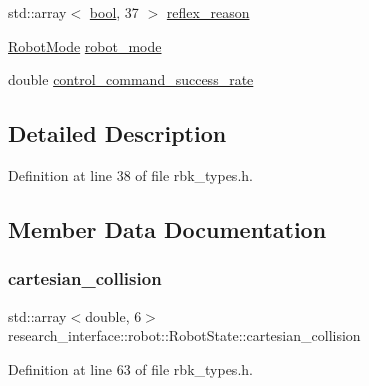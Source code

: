 \begin{DoxyCompactItemize}
\item 
std\+::array$<$ \hyperlink{classbool}{bool}, 37 $>$ \hyperlink{structresearch__interface_1_1robot_1_1RobotState_a173478c94fcf79e6aa2477742eaf1201}{reflex\+\_\+reason}
\item 
\hyperlink{namespaceresearch__interface_1_1robot_a9d089d8f41640bff616c6d4c69ae5c37}{Robot\+Mode} \hyperlink{structresearch__interface_1_1robot_1_1RobotState_a39452d1cd54a0a8b70d5eb6389bbeee7}{robot\+\_\+mode}
\item 
double \hyperlink{structresearch__interface_1_1robot_1_1RobotState_acfa9abdc95abc44b60eb3cd2cc82d37e}{control\+\_\+command\+\_\+success\+\_\+rate}
\end{DoxyCompactItemize}


\subsection{Detailed Description}


Definition at line 38 of file rbk\+\_\+types.\+h.



\subsection{Member Data Documentation}
\mbox{\label{structresearch__interface_1_1robot_1_1RobotState_a26957c17524dd6dbe3b8327db571403a}} 
\subsubsection{\texorpdfstring{cartesian\+\_\+collision}{cartesian\_collision}}
{\footnotesize\ttfamily std\+::array$<$double, 6$>$ research\+\_\+interface\+::robot\+::\+Robot\+State\+::cartesian\+\_\+collision}



Definition at line 63 of file rbk\+\_\+types.\+h.

\mbox{\label{structresearch__interface_1_1robot_1_1RobotState_a0a4d7e24f71507c25f567f145cd99f87}} 
